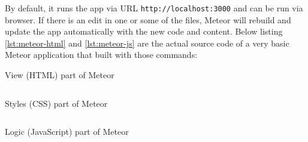 By default, it runs the app via \ac{URL} \verb|http://localhost:3000| and can be run via browser.
If there is an edit in one or some of the files, Meteor will rebuild and update the app automatically with the new code and content.
\noindent Below listing \autoref{lst:meteor-html} and \autoref{lst:meteor-js} are the actual source code of a very basic Meteor application that built with those commands:

\begin{listing}[!hp]
\caption{View (HTML) part of Meteor}
\inputminted{html}{\dir/include/meteor/meteor.html}
\label{lst:meteor-html}
\end{listing}

\begin{listing}[!hp]
\caption{Styles (CSS) part of Meteor}
\inputminted{css}{\dir/include/meteor/meteor.css}
\label{lst:meteor-css}
\end{listing}

\begin{listing}[!hp]
\caption{Logic (JavaScript) part of Meteor}
\inputminted{javascript}{\dir/include/meteor/meteor.js}
\label{lst:meteor-js}
\end{listing}
